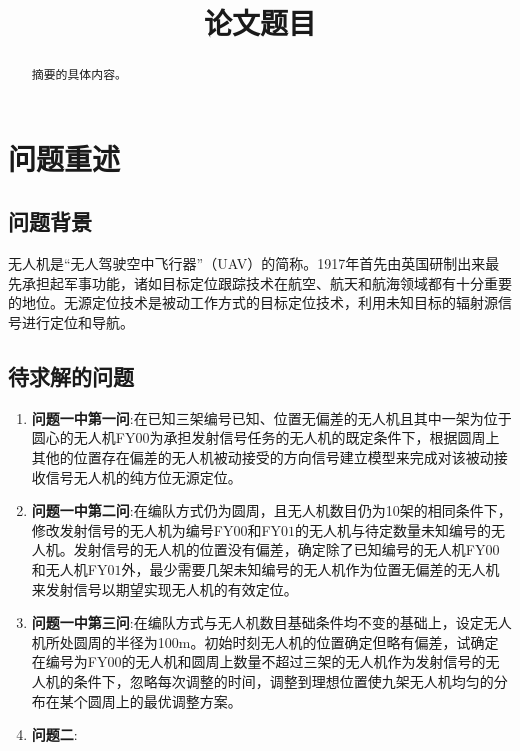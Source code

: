 \documentclass[withoutpreface,bwprint]{cumcmthesis} %
\title{论文题目}
\begin{document}
	\maketitle
	\begin{abstract}
		摘要的具体内容。
	\end{abstract}
	
	
		\section{问题重述}
		\subsection{问题背景}
		\par 无人机是“无人驾驶空中飞行器”（UAV）的简称。1917年首先由英国研制出来最先承担起军事功能，诸如目标定位跟踪技术在航空、航天和航海领域都有十分重要的地位。无源定位技术是被动工作方式的目标定位技术，利用未知目标的辐射源信号进行定位和导航。
		\subsection{待求解的问题}
		\par 
		\begin{enumerate}
			\item{\textbf{问题一中第一问}:}在已知三架编号已知、位置无偏差的无人机且其中一架为位于圆心的无人机FY$ 00 $为承担发射信号任务的无人机的既定条件下，根据圆周上其他的位置存在偏差的无人机被动接受的方向信号建立模型来完成对该被动接收信号无人机的纯方位无源定位。
			\item{\textbf{问题一中第二问}:}在编队方式仍为圆周，且无人机数目仍为10架的相同条件下，修改发射信号的无人机为编号FY$ 00 $和FY$ 01 $的无人机与待定数量未知编号的无人机。发射信号的无人机的位置没有偏差，确定除了已知编号的无人机FY$ 00 $和无人机FY$ 01 $外，最少需要几架未知编号的无人机作为位置无偏差的无人机来发射信号以期望实现无人机的有效定位。
			\item{\textbf{问题一中第三问}:}在编队方式与无人机数目基础条件均不变的基础上，设定无人机所处圆周的半径为100m。初始时刻无人机的位置确定但略有偏差，试确定在编号为FY$ 00 $的无人机和圆周上数量不超过三架的无人机作为发射信号的无人机的条件下，忽略每次调整的时间，调整到理想位置使九架无人机均匀的分布在某个圆周上的最优调整方案。
			\item{\textbf{问题二}:}
		\end{enumerate}
\end{document}
